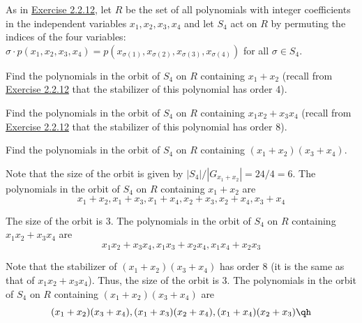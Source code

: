 \begin{exercise}
	As in \hyperref[ex2.2.12]{Exercise 2.2.12}, let $R$ be the set of all polynomials with integer coefficients in the independent variables \(x_1,x_2,x_3,x_4\) and let $S_4$ act on $R$ by permuting the indices of the four variables: \(\sigma \cdot p(x_1,x_2,x_3,x_4) = p(x_{\sigma(1)}, x_{\sigma(2)}, x_{\sigma(3)}, x_{\sigma(4)})\) for all \(\sigma \in S_4\).
	\begin{subproblems}
		\item Find the polynomials in the orbit of $S_4$ on $R$ containing \(x_1 + x_2\) (recall from \hyperref[ex2.2.12]{Exercise 2.2.12} that the stabilizer of this polynomial has order 4).
		\item Find the polynomials in the orbit of $S_4$ on $R$ containing \(x_1 x_2 + x_3 x_4\) (recall from \hyperref[ex2.2.12]{Exercise 2.2.12} that the stabilizer of this polynomial has order 8).
		\item Find the polynomials in the orbit of $S_4$ on $R$ containing \((x_1 + x_2)(x_3 + x_4)\).
	\end{subproblems}
\end{exercise}

\begin{solalph}
	\item Note that the size of the orbit is given by \(|S_4|/|G_{x_1 + x_2}| = 24/4 = 6\). The polynomials in the orbit of $S_4$ on $R$ containing \(x_1 + x_2\) are
	\[x_1 + x_2, x_1 + x_3, x_1 + x_4, x_2 + x_3, x_2 + x_4, x_3 + x_4\]
	\item The size of the orbit is 3. The polynomials in the orbit of $S_4$ on $R$ containing \(x_1 x_2 + x_3 x_4\) are
	\[x_1 x_2 + x_3 x_4, x_1 x_3 + x_2 x_4, x_1 x_4 + x_2 x_3\]
	\item Note that the stabilizer of \((x_1 + x_2)(x_3 + x_4)\) has order 8 (it is the same as that of \(x_1 x_2 + x_3 x_4\)). Thus, the size of the orbit is 3. The polynomials in the orbit of $S_4$ on $R$ containing \((x_1 + x_2)(x_3 + x_4)\) are
	\[(x_1 + x_2)(x_3 + x_4), (x_1 + x_3)(x_2 + x_4), (x_1 + x_4)(x_2 + x_3)\qh\]
\end{solalph}

